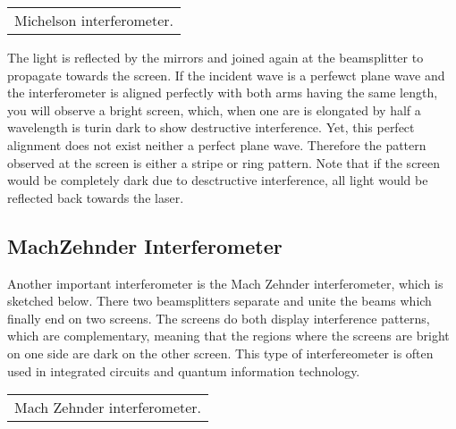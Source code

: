 \documentclass[letterpaper,10pt,english]{sphinxmanual}
\begin{document}
\begin{savenotes}\sphinxattablestart
\centering
\begin{tabulary}{\linewidth}[t]{|T|}
\hline
\sphinxstyletheadfamily 
{}
\\
\hline
{} Michelson interferometer.
\\
\hline
\end{tabulary}
\par
\sphinxattableend\end{savenotes}

The light is reflected by the mirrors and joined again at the beamsplitter to propagate towards the screen. If the incident wave is a perfewct plane wave and the interferometer is aligned perfectly with both arms having the same length, you will observe a bright screen, which, when one are is elongated by half a wavelength is turin dark to show destructive interference. Yet, this perfect alignment does not exist neither a perfect plane wave. Therefore the pattern observed at the screen is either
a stripe or ring pattern. Note that if the screen would be completely dark due to desctructive interference, all light would be reflected back towards the laser.


\subsection{Mach\sphinxhyphen{}Zehnder Interferometer}
\label{\detokenize{notebooks/L9/Interference:Mach-Zehnder-Interferometer}}
Another important interferometer is the Mach Zehnder interferometer, which is sketched below. There two beamsplitters separate and unite the beams which finally end on two screens. The screens do both display interference patterns, which are complementary, meaning that the regions where the screens are bright on one side are dark on the other screen. This type of interfereometer is often used in integrated circuits and quantum information technology.


\begin{savenotes}\sphinxattablestart
\centering
\begin{tabulary}{\linewidth}[t]{|T|}
\hline
\sphinxstyletheadfamily 
{}
\\
\hline
{} Mach Zehnder interferometer.
\\
\hline
\end{tabulary}
\par
\sphinxattableend\end{savenotes}
\end{document}
